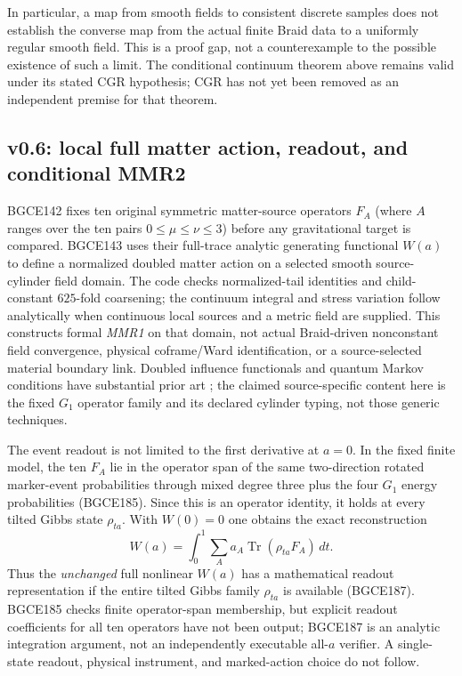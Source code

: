 \documentclass[11pt]{article}
\theoremstyle{definition}
\theoremstyle{remark}
\begin{document}
In particular, a map from smooth fields to consistent discrete samples does not establish the converse map from the actual finite Braid data to a uniformly regular smooth field. This is a proof gap, not a counterexample to the possible existence of such a limit. The conditional continuum theorem above remains valid under its stated CGR hypothesis; CGR has not yet been removed as an independent premise for that theorem.

\subsection{v0.6: local full matter action, readout, and conditional MMR2}\label{sec:v06mmr}

BGCE142 fixes ten original symmetric matter-source operators $F_A$ (where $A$ ranges over the ten pairs $0\leq\mu\leq\nu\leq3$) before any gravitational target is compared. BGCE143 uses their full-trace analytic generating functional $W(a)$ to define a normalized doubled matter action on a selected smooth source-cylinder field domain. The code checks normalized-tail identities and child-constant $625$-fold coarsening; the continuum integral and stress variation follow analytically when continuous local sources and a metric field are supplied. This constructs formal \emph{MMR1} on that domain, not actual Braid-driven nonconstant field convergence, physical coframe/Ward identification, or a source-selected material boundary link. Doubled influence functionals and quantum Markov conditions have substantial prior art \cite{feynmanvernon1963,hayden2004}; the claimed source-specific content here is the fixed $G_1$ operator family and its declared cylinder typing, not those generic techniques.

The event readout is not limited to the first derivative at $a=0$. In the fixed finite model, the ten $F_A$ lie in the operator span of the same two-direction rotated marker-event probabilities through mixed degree three plus the four $G_1$ energy probabilities (BGCE185). Since this is an operator identity, it holds at every tilted Gibbs state $\rho_{ta}$. With $W(0)=0$ one obtains the exact reconstruction
\begin{equation}\label{eq:fullWreadout}
 W(a)=\int_0^1\sum_A a_A\operatorname{Tr}(\rho_{ta}F_A)\,dt .
\end{equation}
Thus the \emph{unchanged} full nonlinear $W(a)$ has a mathematical readout representation if the entire tilted Gibbs family $\rho_{ta}$ is available (BGCE187). BGCE185 checks finite operator-span membership, but explicit readout coefficients for all ten operators have not been output; BGCE187 is an analytic integration argument, not an independently executable all-$a$ verifier. A single-state readout, physical instrument, and marked-action choice do not follow.
\end{document}
